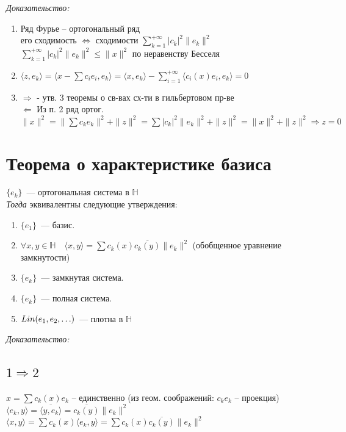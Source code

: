 \documentclass[paper=a4, fontsize=17pt]{article}
\begin{document}
\emph{Доказательство:}
\begin{enumerate}
	\item
	Ряд Фурье -- ортогональный ряд\\
	его сходимость $\Leftrightarrow$ сходимости $\sum\limits_{k=1}^{+\infty} \vert c_k \vert^2 \|e_k\|^2$\\
	$\sum\limits_{k=1}^{+\infty} \vert c_k \vert^2 \|e_k\|^2 \le \|x\|^2$ по неравенству Бесселя
	\item
	$\langle z, e_k \rangle = \langle x - \sum c_i e_i, e_k \rangle = \langle x, e_k \rangle - \sum\limits_{i = 1}^{+\infty}  \langle c_i(x) e_i ,e_k \rangle = 0$
	\item
	$\Rightarrow$ - утв. 3 теоремы о св-вах сх-ти в гильбертовом пр-ве\\
	$\Leftarrow$
		Из п. 2 ряд ортог.\\
		$\|x\|^2=\|\sum c_k e_k\|^2 + \|z\|^2 = \sum \vert c_k \vert^2 \|e_k\|^2 + \|z\|^2 = \|x\|^2 + \|z\|^2 \Rightarrow z = 0$
\end{enumerate}

\section{Теорема о характеристике базиса}

$\{e_k\}$~--- ортогональная система в $\mathds{H}$\\

\emph{Тогда} эквивалентны следующие утверждения:
\begin{enumerate}
	\item $\{e_1\}$~--- базис.
	\item $\forall x, y \in \mathds{H} \quad \langle x, y \rangle = \sum c_k(x)\overline{c_k(y)}\|e_k\|^2$ (обобщенное уравнение замкнутости)
	\item $\{e_k\}$~--- замкнутая система.
	\item $\{e_k\}$~--- полная система.
	\item $Lin(e_1, e_2, \mathellipsis)$~--- плотна в $\mathds{H}$
\end{enumerate}

\emph{Доказательство:}

\subsection{\texorpdfstring{$1 \Rightarrow 2$}{TEXT}}
$x=\sum c_k(x) e_k$ -- единственно (из геом. соображений: $c_k e_k$ -- проекция)\\
$\langle e_k, y \rangle = \overline{\langle y, e_k \rangle} = \overline{c_k(y)}\|e_k\|^2$\\
$\langle x, y \rangle = \sum c_k(x) \langle e_k, y \rangle = \sum c_k(x)\overline{c_k(y)}\|e_k\|^2$
\end{document}
